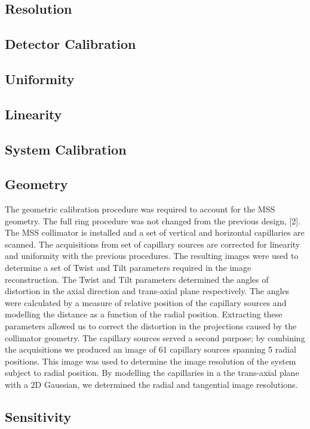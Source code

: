 \subsection{Resolution}
\subsection{Detector Calibration}
\subsection{Uniformity}


\subsection{Linearity} 
\subsection{System Calibration}
\subsection{Geometry}
The geometric calibration procedure was required to account
for the MSS geometry. The full ring procedure was not
changed from the previous design, [2]. The MSS collimator
is installed and a set of vertical and horizontal capillaries
are scanned. The acquisitions from set of capillary sources
are corrected for linearity and uniformity with the previous
procedures. The resulting images were used to determine
a set of Twist and Tilt parameters required in the image
reconstruction. The Twist and Tilt parameters determined the
angles of distortion in the axial direction and trans-axial
plane respectively. The angles were calculated by a measure
of relative position of the capillary sources and modelling
the distance as a function of the radial position. Extracting
these parameters allowed us to correct the distortion in the
projections caused by the collimator geometry.
The capillary sources served a second purpose; by combining
the acquisitions we produced an image of 61 capillary
sources spanning 5 radial positions. This image was used to
determine the image resolution of the system subject to radial
position. By modelling the capillaries in a the trans-axial plane
with a 2D Gaussian, we determined the radial and tangential
image resolutions.

\subsection{Sensitivity}
